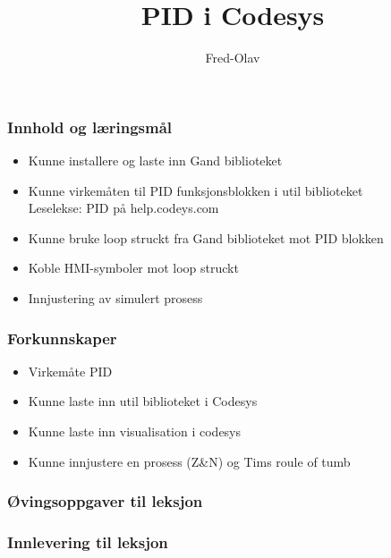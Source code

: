 \documentclass{beamer}
\title{PID i Codesys}
\author{Fred-Olav}
\begin{document}
\maketitle

\begin{frame}
	\frametitle{Innhold og læringsmål}
	\begin{itemize}%
		\item Kunne installere og laste inn Gand biblioteket
		\item Kunne virkemåten til PID funksjonsblokken i util biblioteket \\Leselekse: PID på help.codeys.com
		\item Kunne bruke loop struckt fra Gand biblioteket mot PID blokken
		\item Koble HMI-symboler mot loop struckt
		\item Innjustering av simulert prosess
	\end{itemize}
\end{frame}

\begin{frame}
	\frametitle{Forkunnskaper}

	\begin{itemize}%
		\item Virkemåte PID
		\item Kunne laste inn util  biblioteket i Codesys 
		\item Kunne laste inn visualisation i codesys
		\item Kunne innjustere en prosess (Z\&N) og Tims roule of tumb
	\end{itemize}
\end{frame}

\begin{frame}
	\frametitle{Øvingsoppgaver til leksjon}
\end{frame}

\begin{frame}
	\frametitle{Innlevering til leksjon}
\end{frame}
\end{document}
